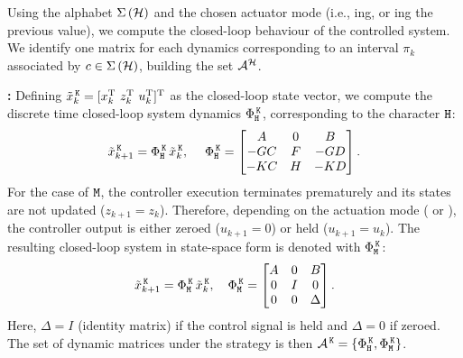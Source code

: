 Using the alphabet $\Sigma\,(\mathcal{H})$ and the chosen actuator mode (i.e., \tZ{}ing, or \tH{}ing the previous value), we compute the closed-loop behaviour of the controlled system.
We identify one matrix for each dynamics corresponding to an interval $\pi_k$ associated by $c \in \Sigma\,( \mathcal{H} )$, building the set $\mathcal{A}^{\mathcal{H}}$.

\textbf{\tK{}: }%
%
Defining $\tilde x_k^{\,\texttt{K}} = [ x_k^{\mathrm{\small{T}}}{}\,\, z_k^{\mathrm{\small{T}}}{}\,\, u_k^{\mathrm{\small{T}}}{} ]^{\mathrm{\small{T}}}{}$ as the closed-loop state vector,
we compute the discrete time closed-loop system dynamics $\Phi{}^{\,\texttt{K}}_{\texttt{H}}$, corresponding to the character $\texttt{H}$:
\begin{equation*}
    \tilde x_{k+1}^{\,\texttt{K}} = \Phi{}^{\,\texttt{K}}_{\texttt{H}}\,\tilde x_k^{\,\texttt{K}}, \quad\;
     \Phi{}^{\,\texttt{K}}_{\texttt{H}} = \begin{bmatrix}
        A       & 0    & B       \\
        -GC   & F  & -GD   \\
        -KC   & H  & -KD   \\
    \end{bmatrix}.
\end{equation*}
%
For the case of $\texttt{M}$, the controller execution terminates prematurely and its states are not updated ($z_{k+1} = z_k$).
Therefore, depending on the actuation mode (\tZ{} or \tH{}), the controller output is either zeroed ($u_{k+1} = 0$) or held ($u_{k+1} = u_k$).
The resulting closed-loop system in state-space form is denoted with $\Phi{}^{\,\texttt{K}}_{\texttt{M}}$:
\begin{equation*}
    \tilde x_{k+1}^{\,\texttt{K}} = \Phi{}^{\,\texttt{K}}_{\texttt{M}}\,\tilde x_k^{\,\texttt{K}}, \quad
   \Phi{}^{\,\texttt{K}}_{\texttt{M}} = \begin{bmatrix}
        A & 0  & B \\
        0   & I  & 0   \\
        0   & 0  & \Delta
    \end{bmatrix}.
\end{equation*}
Here, $\Delta = I$ (identity matrix) if the control signal is held and $\Delta = 0$ if zeroed.
The set of dynamic matrices under the \tK{} strategy is then $\mathcal{A}^{\,\texttt{K}}=\{\Phi{}^{\,\texttt{K}}_{\texttt{H}},\Phi{}^{\,\texttt{K}}_{\texttt{M}}\}$.

